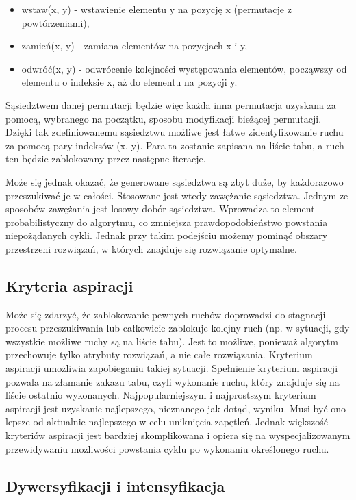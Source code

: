 \begin{itemize}
	\item wstaw(x, y) - wstawienie elementu y na pozycję x (permutacje z powtórzeniami),
	\item zamień(x, y) - zamiana elementów na pozycjach x i y,
	\item odwróć(x, y) - odwrócenie kolejności występowania elementów, począwszy od elementu o indeksie x, aż do elementu na pozycji y.
\end{itemize}

Sąsiedztwem danej permutacji będzie więc każda inna permutacja uzyskana za pomocą, wybranego na początku, sposobu modyfikacji bieżącej permutacji. Dzięki tak zdefiniowanemu sąsiedztwu możliwe jest łatwe zidentyfikowanie ruchu za pomocą pary indeksów (x, y). Para ta zostanie zapisana na liście tabu, a ruch ten będzie zablokowany przez następne iteracje.

Może się jednak okazać, że generowane sąsiedztwa są zbyt duże, by każdorazowo przeszukiwać je w całości. Stosowane jest wtedy zawężanie sąsiedztwa. Jednym ze sposobów zawężania jest losowy dobór sąsiedztwa. Wprowadza to element probabilistyczny do algorytmu, co zmniejsza prawdopodobieństwo powstania niepożądanych cykli. Jednak przy takim podejściu możemy pominąć obszary przestrzeni rozwiązań, w których znajduje się rozwiązanie optymalne.

\subsection{Kryteria aspiracji}

Może się zdarzyć, że zablokowanie pewnych ruchów doprowadzi do stagnacji procesu przeszukiwania lub całkowicie zablokuje kolejny ruch (np. w sytuacji, gdy wszystkie możliwe ruchy są na liście tabu). Jest to możliwe, ponieważ algorytm przechowuje tylko atrybuty rozwiązań, a nie całe rozwiązania. Kryterium aspiracji umożliwia zapobieganiu takiej sytuacji.
Spełnienie kryterium aspiracji pozwala na złamanie zakazu tabu, czyli wykonanie ruchu, który znajduje się na liście ostatnio wykonanych. Najpopularniejszym i najprostszym kryterium aspiracji jest uzyskanie najlepszego, nieznanego jak dotąd, wyniku. Musi być ono lepsze od aktualnie najlepszego w celu uniknięcia zapętleń. Jednak większość kryteriów aspiracji jest bardziej skomplikowana i opiera się na wyspecjalizowanym przewidywaniu możliwości powstania cyklu po wykonaniu określonego ruchu.

\subsection{Dywersyfikacji i intensyfikacja}

